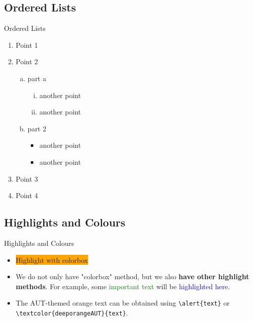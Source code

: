 \documentclass[aspectratio=169, 12pt]{beamer}    %
\begin{document}
\subsection{Ordered Lists}
\begin{frame}{Ordered Lists}
    \begin{enumerate}%
    \item Point 1 
    \item Point 2 
    \begin{enumerate}[a.]
        \item part a 
            \begin{enumerate}[i.]
                \item another point
                \item another point
            \end{enumerate}
        \item part 2 
            \begin{itemize}%
                \item another point
                \item another point
            \end{itemize}
    \end{enumerate}
    \item Point 3 
    \item Point 4 
    \end{enumerate}
\end{frame}



\subsection{Highlights and Colours}
\begin{frame}[fragile]{Highlights and Colours}

\begin{itemize}
\item 
    \colorbox{orange}{Highlight with colorbox} \\
    
\item 
    We do not only have "colorbox" method, but we also \textbf{have other highlight methods}. \alert{For example}, some \textcolor{green}{important text} will be \textcolor{blue}{highlighted here.} \\
    
\item     
    The AUT-themed orange text can be obtained using \verb|\alert{text}| or \verb|\textcolor{deeporangeAUT}{text}|.
\end{itemize}
    
    
\end{frame}
\end{document}
